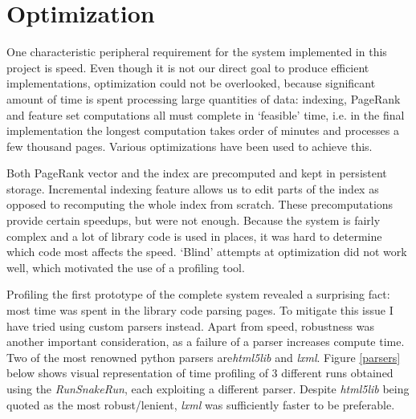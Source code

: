 \documentclass[11pt,twoside,notitlepage]{report}
\begin{document}
\section{Optimization}

One characteristic peripheral requirement for the system implemented in this
project is speed.  Even though it is not our direct goal to produce efficient
implementations, optimization could not be overlooked, because significant
amount of time is spent processing large quantities of data: indexing, PageRank
and feature set computations all must complete in `feasible' time, i.e. in the
final implementation the longest computation takes order of minutes and
processes a few thousand pages. Various optimizations have been used to achieve
this. 

Both PageRank vector and the index are precomputed and kept in
persistent storage. Incremental indexing feature allows us to edit parts of the
index as opposed to recomputing the whole index from scratch. These
precomputations provide certain speedups, but were not enough.  Because the
system is fairly complex and a lot of library code is used in places, it was
hard to determine which code most affects the speed. `Blind' attempts at
optimization did not work well, which motivated the use of a profiling tool.

Profiling the first prototype of the complete system revealed a surprising
fact: most time was spent in the library code parsing pages. To mitigate this
issue I have tried using custom parsers instead. Apart from speed, robustness
was another important consideration, as a failure of a parser increases compute
time. Two of the most renowned python parsers are\textit{html5lib} and
\textit{lxml}.  Figure
\ref{parsers} below shows visual representation of time profiling of 3
different runs obtained using the \textit{RunSnakeRun}, each exploiting a
different parser.  Despite \textit{html5lib} being quoted as the most
robust/lenient, \textit{lxml} was sufficiently faster to be preferable.
\end{document}
